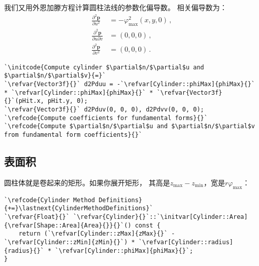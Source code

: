 我们又用外恩加滕方程计算圆柱法线的参数化偏导数。
相关偏导数为：
\begin{align*}
    \frac{\partial^2\bm p}{\partial u^2}         & =-\varphi_{\max}^2(x,y,0)\, , \\
    \frac{\partial^2\bm p}{\partial u\partial v} & =(0,0,0)\, ,                  \\
    \frac{\partial^2\bm p}{\partial v^2}         & =(0,0,0)\, .
\end{align*}
\begin{lstlisting}
`\initcode{Compute cylinder $\partial$n/$\partial$u and $\partial$n/$\partial$v}{=}`
`\refvar{Vector3f}{}` d2Pduu = -`\refvar[Cylinder::phiMax]{phiMax}{}` * `\refvar[Cylinder::phiMax]{phiMax}{}` * `\refvar{Vector3f}{}`(pHit.x, pHit.y, 0);
`\refvar{Vector3f}{}` d2Pduv(0, 0, 0), d2Pdvv(0, 0, 0);
`\refcode{Compute coefficients for fundamental forms}{}`
`\refcode{Compute $\partial$n/$\partial$u and $\partial$n/$\partial$v from fundamental form coefficients}{}`
\end{lstlisting}

\subsection{表面积}\label{sub:表面积3}
圆柱体就是卷起来的矩形。如果你展开矩形，
其高是$z_{\max}-z_{\min}$，宽是$r\varphi_{\max}$：
\begin{lstlisting}
`\refcode{Cylinder Method Definitions}{+=}\lastnext{CylinderMethodDefinitions}`
`\refvar{Float}{}` `\refvar{Cylinder}{}`::`\initvar[Cylinder::Area]{\refvar[Shape::Area]{Area}{}}{}`() const {
    return (`\refvar[Cylinder::zMax]{zMax}{}` - `\refvar[Cylinder::zMin]{zMin}{}`) * `\refvar[Cylinder::radius]{radius}{}` * `\refvar[Cylinder::phiMax]{phiMax}{}`;
}
\end{lstlisting}